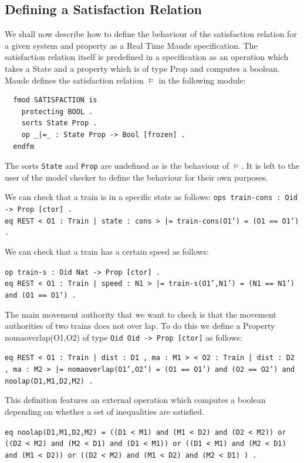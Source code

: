 \subsection*{Defining a Satisfaction Relation}
We shall now describe how to define the behaviour of the satisfaction relation for a given system and property as a Real Time Maude specification. The satisfaction relation itself is predefined in a specification as an operation which takes a State and a property which is of type Prop and computes a boolean. Maude defines the satisfaction relation $\models$ in the following module:
\begin{verbatim}
  fmod SATISFACTION is  
    protecting BOOL .  
    sorts State Prop .  
    op _|=_ : State Prop -> Bool [frozen] .  
  endfm
\end{verbatim}
The sorts \texttt{State} and \texttt{Prop} are undefined as is the behaviour of $\models$. It is left to the user of the model checker to define the behaviour for their own purposes.

We can check that a train is in a specific state as follows:
\texttt{ops train-cons : Oid -> Prop [ctor] .} \\ \medskip
\texttt{eq {REST < O1 : Train | state : cons >} |= train-cons(O1') = (O1 == O1') . } \\
\bigskip

We can check that a train has a certain speed as follows:

\texttt{op train-s : Oid Nat -> Prop [ctor] .} \\ \medskip
\texttt{eq {REST < O1 : Train | speed : N1 >} |= train-s(O1',N1') = (N1 == N1') and (O1 == O1') .}

The main movement authority that we want to check is that the movement authorities of two trains does not over lap.
To do this we define a Property nomaoverlap(O1,O2) of type \texttt{Oid Oid -> Prop [ctor]} as follows: 

\begin{center}
\texttt{eq {REST < O1 : Train |  dist : D1 , ma : M1 > < O2 : Train |  dist : D2 , ma : M2 >} |= nomaoverlap(O1',O2') = (O1 == O1') and (O2 == O2') and noolap(D1,M1,D2,M2) .} 
\end{center}

This definition features an external operation which computes a boolean depending on whether a set of inequalities are satisfied. 

\begin{center}
\texttt{eq noolap(D1,M1,D2,M2) = ((D1 < M1) and (M1 < D2) and (D2 < M2)) or ((D2 < M2) and (M2 < D1) and (D1 < M1)) or ((D1 < M1) and (M2 < D1) and (M1 < D2)) or ((D2 < M2) and (M1 < D2) and (M2 < D1) )  .}    
\end{center}

